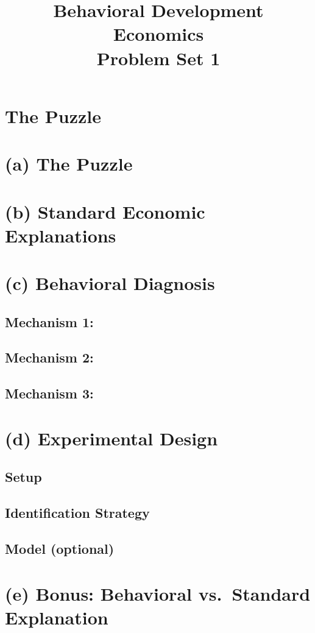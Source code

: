 \documentclass[12pt]{article}
\title{Behavioral Development Economics\\Problem Set 1}
\author{}
\date{}
\begin{document}
\maketitle

\section*{The Puzzle}


\section*{(a) The Puzzle}

\section*{(b) Standard Economic Explanations}

\section*{(c) Behavioral Diagnosis}

\subsection*{Mechanism 1:}

\subsection*{Mechanism 2:}

\subsection*{Mechanism 3:}

\section*{(d) Experimental Design}


\subsection*{Setup}

\subsection*{Identification Strategy}

\subsection*{Model (optional)}

\section*{(e) Bonus: Behavioral vs.\ Standard Explanation}

\end{document}

